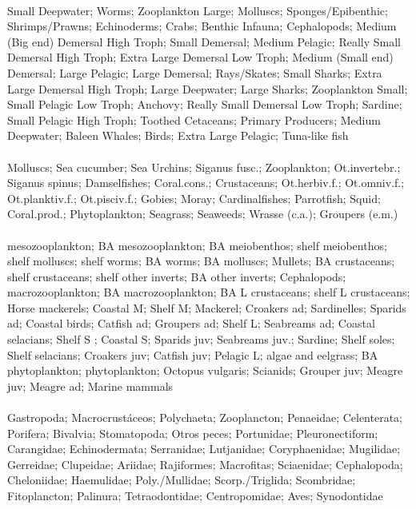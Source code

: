\fullhline
\hline
{} \\
\hline
Small Deepwater; Worms; Zooplankton Large; Molluscs; Sponges/Epibenthic; Shrimps/Prawns; Echinoderms; Crabs; Benthic Infauna; Cephalopods; Medium (Big end) Demersal  High Troph; Small Demersal; Medium Pelagic; Really Small Demersal High Troph; Extra Large Demersal Low Troph; Medium (Small end) Demersal; Large Pelagic; Large Demersal; Rays/Skates; Small Sharks; Extra Large Demersal High Troph; Large Deepwater; Large Sharks; Zooplankton Small; Small Pelagic Low Troph; Anchovy; Really Small Demersal Low Troph; Sardine; Small Pelagic High Troph; Toothed Cetaceans; Primary Producers; Medium Deepwater; Baleen Whales; Birds; Extra Large Pelagic; Tuna-like fish\\
\fullhline
\hline
{} \\
\hline
Molluscs; Sea cucumber; Sea Urchins; Siganus fusc.; Zooplankton; Ot.invertebr.; Siganus spinus; Damselfishes; Coral.cons.; Crustaceans; Ot.herbiv.f.; Ot.omniv.f.; Ot.planktiv.f.; Ot.pisciv.f.; Gobies; Moray; Cardinalfishes; Parrotfish; Squid; Coral.prod.; Phytoplankton; Seagrass; Seaweeds; Wrasse (c.a.); Groupers (e.m.)\\
\fullhline
\hline
{} \\
\hline
mesozooplankton; BA mesozooplankton; BA meiobenthos; shelf meiobenthos; shelf molluscs; shelf worms; BA worms; BA molluscs; Mullets; BA crustaceans; shelf crustaceans; shelf other inverts; BA other inverts; Cephalopods; macrozooplankton; BA macrozooplankton; BA L crustaceans; shelf L crustaceans; Horse mackerels; Coastal M; Shelf M; Mackerel; Croakers ad; Sardinelles; Sparids ad; Coastal birds; Catfish ad; Groupers ad; Shelf L; Seabreams ad; Coastal selacians; Shelf S ; Coastal S; Sparids juv; Seabreams juv.; Sardine; Shelf soles; Shelf selacians; Croakers juv; Catfish juv; Pelagic L; algae and eelgrass; BA phytoplankton; phytoplankton; Octopus vulgaris; Scianids; Grouper juv; Meagre juv; Meagre ad; Marine mammals\\
\fullhline
\hline
{} \\
\hline
Gastropoda; Macrocrustáceos; Polychaeta; Zooplancton; Penaeidae; Celenterata; Porifera; Bivalvia; Stomatopoda; Otros peces; Portunidae; Pleuronectiform; Carangidae; Echinodermata; Serranidae; Lutjanidae; Coryphaenidae; Mugilidae; Gerreidae; Clupeidae; Ariidae; Rajiformes; Macrofitas; Sciaenidae; Cephalopoda; Cheloniidae; Haemulidae; Poly./Mullidae; Scorp./Triglida; Scombridae; Fitoplancton; Palinura; Tetraodontidae; Centropomidae; Aves; Synodontidae\\
